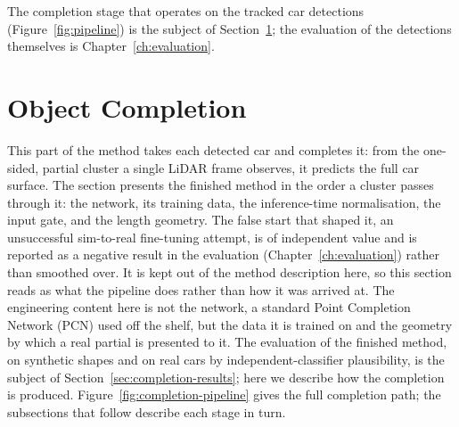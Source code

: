 The completion stage that operates on the tracked car detections
(Figure~\ref{fig:pipeline}) is the subject of Section~\ref{ch:completion-method}; the evaluation of
the detections themselves is Chapter~\ref{ch:evaluation}.



%
%
%
%
%
\section{Object Completion}
\label{ch:completion-method}

This part of the method takes each detected car and completes it:
from the one-sided, partial cluster a single LiDAR frame observes, it predicts
the full car surface. The section presents the finished method in the order a
cluster passes through it: the network, its training data, the inference-time
normalisation, the input gate, and the length geometry. The false start that shaped
it, an unsuccessful sim-to-real fine-tuning attempt, is of independent value and is
reported as a negative result in the evaluation (Chapter~\ref{ch:evaluation}) rather
than smoothed over. It is kept out of the method description here, so this section
reads as what the pipeline does rather than how it was arrived at. The engineering
content here is not the network, a standard Point Completion Network (PCN) used off the
shelf, but the data it is trained on and the geometry by which a real partial is
presented to it. The evaluation of the finished method, on synthetic shapes and on real
cars by independent-classifier plausibility, is the subject of
Section~\ref{sec:completion-results}; here we describe how the completion is produced.
Figure~\ref{fig:completion-pipeline} gives the full completion path; the subsections
that follow describe each stage in turn.

